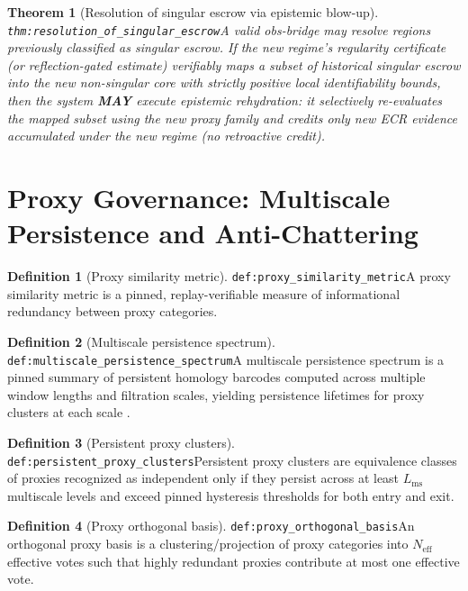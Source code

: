 \documentclass[11pt]{article}
\theoremstyle{definition}
\newtheorem{definition}{Definition}
\theoremstyle{plain}
\newtheorem{theorem}{Theorem}
\newcommand{\MAY}{\textbf{MAY}}
\newcommand{\lbl}[1]{\texttt{\footnotesize\nolinkurl{#1}}}
\newcommand{\DefLabel}[1]{\hfill{\small\lbl{#1}}}
\newcommand{\Neff}{N_{\mathrm{eff}}}
\newcommand{\Lms}{L_{\mathrm{ms}}}
\begin{document}
\begin{theorem}[Resolution of singular escrow via epistemic blow-up]\DefLabel{thm:resolution_of_singular_escrow}\label{thm:resolution_of_singular_escrow}
A valid obs-bridge may resolve regions previously classified as singular escrow.
If the new regime's regularity certificate (or reflection-gated estimate) verifiably maps a subset of historical singular escrow into the new non-singular core with strictly positive local identifiability bounds, then the system \MAY{} execute epistemic rehydration: it selectively re-evaluates the mapped subset using the new proxy family and credits only new ECR evidence accumulated under the new regime (no retroactive credit).
\end{theorem}

\section{Proxy Governance: Multiscale Persistence and Anti-Chattering}\label{sec:proxies}
\begin{definition}[Proxy similarity metric]\DefLabel{def:proxy_similarity_metric}\label{def:proxy_similarity_metric}
A proxy similarity metric is a pinned, replay-verifiable measure of informational redundancy between proxy categories.
\end{definition}

\begin{definition}[Multiscale persistence spectrum]\DefLabel{def:multiscale_persistence_spectrum}\label{def:multiscale_persistence_spectrum}
A multiscale persistence spectrum is a pinned summary of persistent homology barcodes computed across multiple window lengths and filtration scales, yielding persistence lifetimes for proxy clusters at each scale \cite{Edelsbrunner2002,Ghrist2008}.
\end{definition}

\begin{definition}[Persistent proxy clusters]\DefLabel{def:persistent_proxy_clusters}\label{def:persistent_proxy_clusters}
Persistent proxy clusters are equivalence classes of proxies recognized as independent only if they persist across at least $\Lms$ multiscale levels and exceed pinned hysteresis thresholds for both entry and exit.
\end{definition}

\begin{definition}[Proxy orthogonal basis]\DefLabel{def:proxy_orthogonal_basis}\label{def:proxy_orthogonal_basis}
An orthogonal proxy basis is a clustering/projection of proxy categories into $\Neff$ effective votes such that highly redundant proxies contribute at most one effective vote.
\end{definition}
\end{document}

